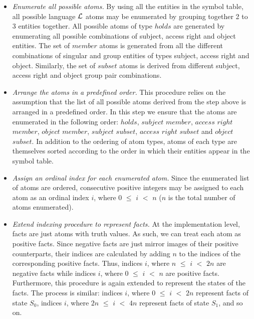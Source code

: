 \documentclass[glov2,twocolumn,final]{svjour2}
\begin{document}
          \begin{itemize}

            \item
              {\em Enumerate all possible atoms.}
              By using all the entities in the symbol table, all possible
              language ${\cal L}$ atoms may be enumerated by grouping together
              2 to 3 entities together. All possible atoms of type $holds$ are
              generated by enumerating all possible combinations of subject,
              access right and object entities. The set of $member$ atoms is
              generated from all the different combinations of singular and
              group entities of types subject, access right and object.
              Similarly, the set of $subset$ atoms is derived from different
              subject, access right and object group pair combinations.

            \item
              {\em Arrange the atoms in a predefined order.}
              This procedure relies on the assumption that the list of all
              possible atoms derived from the step above is arranged in a
              predefined order. In this step we ensure that the atoms are
              enumerated in the following order: $holds$, $subject$ $member$,
              $access$ $right$ $member$, $object$ $member$, $subject$
              $subset$, $access$ $right$ $subset$ and $object$ $subset$. In
              addition to the ordering of atom types, atoms of each type are
              themselves sorted according to the order in which their entities
              appear in the symbol table.

            \item
              {\em Assign an ordinal index for each enumerated atom.}
              Since the enumerated list of atoms are ordered, consecutive
              positive integers may be assigned to each atom as an ordinal
              index $i$, where $0$ $\leq$ $i$ $<$ $n$ ($n$ is the total number
              of atoms enumerated).

            \item
              {\em Extend indexing procedure to represent facts.} At the
              implementation level, facts are just atoms with truth values.
              As such, we can treat each atom as positive facts. Since negative
              facts are just mirror images of their positive counterparts,
              their indices are calculated by adding $n$ to the indices of the
              corresponding positive facts. Thus, indices $i$, where $n$ $\leq$
              $i$ $<$ $2n$ are negative facts while indices $i$, where $0$
              $\leq$ $i$ $<$ $n$ are positive facts. Furthermore, this
              procedure is again extended to represent the states of the
              facts. The process is similar: indices $i$, where $0$ $\leq$ $i$
              $<$ $2n$ represent facts of state $S_{0}$, indices $i$, where
              $2n$ $\leq$ $i$ $<$ $4n$ represent facts of state $S_{1}$, and
              so on.
          \end{itemize}
\end{document}

